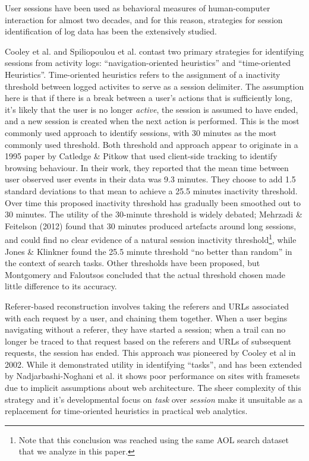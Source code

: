 User sessions have been used as behavioral measures of human-computer interaction for almost two decades, and for this reason, strategies for session identification of log data has been the extensively studied\cite{eickhoff2014lessons}.

Cooley et al.\cite{cooley1999data} and Spiliopoulou et al.\cite{spiliopoulou2003framework} contast two primary strategies for identifying sessions from activity logs: ``navigation-oriented heuristics'' and ``time-oriented Heuristics''.  Time-oriented heuristics refers to the assignment of a inactivity threshold between logged activites to serve as a session delimiter.  The assumption here is that if there is a break between a user's actions that is sufficiently long, it's likely that the user is no longer \emph{active}, the session is assumed to have ended, and a new session is created when the next action is performed. This is the most commonly used approach to identify sessions, with 30 minutes as the most commonly used threshold\cite{spiliopoulou2003framework,eickhoff2014lessons,ortega2010differences}.  Both threshold and approach appear to originate in a 1995 paper by Catledge \& Pitkow\cite{catledge1995characterizing} that used client-side tracking to identify browsing behaviour. In their work, they reported that the mean time between user observed user events in their data was 9.3 minutes.  They choose to add 1.5 standard deviations to that mean to achieve a 25.5 minutes inactivity threshold.  Over time this proposed inactivity threshold has gradually been smoothed out to 30 minutes.  The utility of the 30-minute threshold is widely debated; Mehrzadi \& Feitelson (2012) \cite{mehrzadi2012onextracting} found that 30 minutes produced artefacts around long sessions, and could find no clear evidence of a natural session inactivity threshold\footnote{Note that this conclusion was reached using the same AOL search dataset that we analyze in this paper.}, while Jones \& Klinkner\cite{jones2008beyond} found the 25.5 minute threshold ``no better than random'' in the context of search tasks. Other thresholds have been proposed, but Montgomery and Faloutsos\cite{montgomery2001identifying} concluded that the actual threshold chosen made little difference to its accuracy.

Referer-based reconstruction involves taking the referers and URLs associated with each request by a user, and chaining them together. When a user begins navigating without a referer, they have started a session; when a trail can no longer be traced to that request based on the referers and URLs of subsequent requests, the session has ended.  This approach was pioneered by Cooley et al in 2002\cite{cooley1999data}.  While it demonstrated utility in identifying ``tasks'', and has been extended by Nadjarbashi-Noghani et al.\cite{nadjarbashi2004improving} it shows poor performance on sites with framesets due to implicit assumptions about web architecture\cite{berendt2003impact}. The sheer complexity of this strategy and it's developmental focus on \emph{task} over \emph{session} make it unsuitable as a replacement for time-oriented heuristics in practical web analytics.

